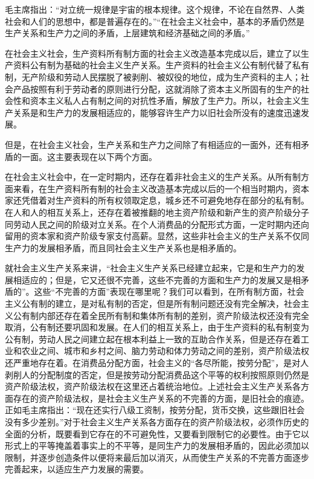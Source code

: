 \documentclass{book}
\begin{document}
毛主席指出：“对立统一规律是宇宙的根本规律。这个规律，不论在自然界、人类社会和人们的思想中，都是普遍存在的。”“在社会主义社会中，基本的矛盾仍然是生产关系和生产力之间的矛盾，上层建筑和经济基础之间的矛盾。”

在社会主义社会，生产资料所有制方面的社会主义改造基本完成以后，建立了以生产资料公有制为基础的社会主义生产关系。生产资料的社会主义公有制代替了私有制，无产阶级和劳动人民摆脱了被剥削、被奴役的地位，成为生产资料的主人；社会产品按照有利于劳动者的原则进行分配，这就消除了资本主义所固有的生产的社会性和资本主义私人占有制之间的对抗性矛盾，解放了生产力。所以，社会主义生产关系是和生产力的发展相适应的，能够容许生产力以旧社会所没有的速度迅速发展。

但是，在社会主义社会，生产关系和生产力之间除了有相适应的一面外，还有相矛盾的一面。这主要表现在以下两个方面。

在社会主义社会中，在一定时期内，还存在着非社会主义的生产关系。从所有制方面来看，在生产资料所有制的社会主义改造基本完成以后的一个相当时期内，资本家还凭借着对生产资料的所有权领取定息，城乡还不可避免地存在部分的私有制。在人和人的相互关系上，还存在着被推翻的地主资产阶级和新产生的资产阶级分子同劳动人民之间的阶级对立关系。在个人消费品的分配形式方面，一定时期内还向留用的资本家和资产阶级专家支付高薪。显然，这些非社会主义的生产关系不仅同生产力的发展相矛盾，而且同社会主义生产关系也是相矛盾的。

就社会主义生产关系来讲，“社会主义生产关系已经建立起来，它是和生产力的发展相适应的；但是，它又还很不完善，这些不完善的方面和生产力的发展又是相矛盾的”。这些“不完善的方面”表现在哪里呢？我们可以看到，在所有制方面，社会主义公有制的建立，是对私有制的否定，但是所有制问题还没有完全解决，社会主义公有制内部还存在着全民所有制和集体所有制的差别，资产阶级法权还没有完全取消，公有制还要巩固和发展。在人们的相互关系上，由于生产资料的私有制变为公有制，劳动人民之间建立起在根本利益上一致的互助合作关系，但是还存在着工业和农业之间、城市和乡村之间、脑力劳动和体力劳动之间的差别，资产阶级法权还严重地存在着。在消费品分配方面，社会主义的“各尽所能，按劳分配”，是对人剥削人的分配制度的否定，但是按劳动分配消费品这个平等的权利按照原则仍然是资产阶级法权，资产阶级法权在这里还占着统治地位。上述社会主义生产关系各方面存在的资产阶级法权，是社会主义生产关系的不完善的方面，是旧社会的痕迹。正如毛主席指出：“现在还实行八级工资制，按劳分配，货币交换，这些跟旧社会没有多少差别。”对于社会主义生产关系各方面存在的资产阶级法权，必须作历史的全面的分析，既要看到它存在的不可避免性，又要看到限制它的必要性。由于它以形式上的平等掩盖着事实上的不平等，是同生产力的发展相矛盾的，因此必须加以限制，并逐步创造条件以便将来最后加以消灭，从而使生产关系的不完善方面逐步完善起来，以适应生产力发展的需要。
\end{document}
